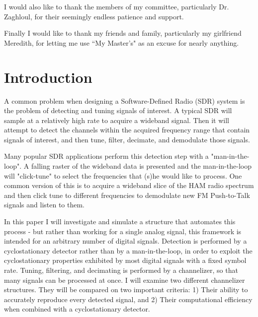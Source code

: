 \documentclass[12pt,dvips]{report}
\begin{document}
I would also like to thank the members of my committee, particularly Dr.
Zaghloul, for their seemingly endless patience and support.

Finally I would like to thank my friends and family, particularly my girlfriend Meredith, for letting me use ``My Master's" as an excuse for nearly anything.

\tableofcontents
\pagebreak

\listoffigures
\pagebreak

\listoftables
\pagebreak

\pagestyle{myheadings}

\chapter{Introduction}
\label{sec:intro}

A common problem when designing a Software-Defined Radio (SDR) system is the
problem of detecting and tuning signals of interest. A typical SDR will sample
at a relatively high rate to acquire a wideband signal. Then it will attempt to
detect the channels within the acquired frequency range that contain signals of
interest, and then tune, filter, decimate, and demodulate those signals. 

Many popular SDR applications perform this detection step with a
"man-in-the-loop".  A falling raster of the wideband data is presented and the
man-in-the-loop will "click-tune" to select  the frequencies that (s)he would
like to process. One common version of this is to acquire a wideband slice of
the HAM radio spectrum and then click tune to different frequencies to
demodulate new FM Push-to-Talk signals and listen to them.

In this paper I will investigate and simulate a structure that automates this
process - but rather than working for a single analog signal, this framework is
intended for an arbitrary number of digital signals. Detection is performed by
a cyclostationary detector rather than by a man-in-the-loop, in order to exploit
the cyclostationary properties exhibited by most digital signals with a fixed
symbol rate.  Tuning, filtering, and decimating is performed by a channelizer, so
that many signals can be processed at once.  I will examine two different
channelizer structures. They will be compared on two important criteria:
1) Their ability to accurately reproduce every detected signal, and 2) Their
computational efficiency when combined with a cyclostationary detector.
\end{document}
